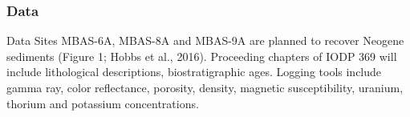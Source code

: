\subsubsection{Data}Data
Sites MBAS-6A, MBAS-8A and MBAS-9A are planned to recover Neogene sediments (Figure 1; Hobbs et al., 2016). Proceeding chapters of IODP 369 will include lithological descriptions, biostratigraphic ages. Logging tools include gamma ray, color reflectance, porosity, density, magnetic susceptibility, uranium, thorium and potassium concentrations.
